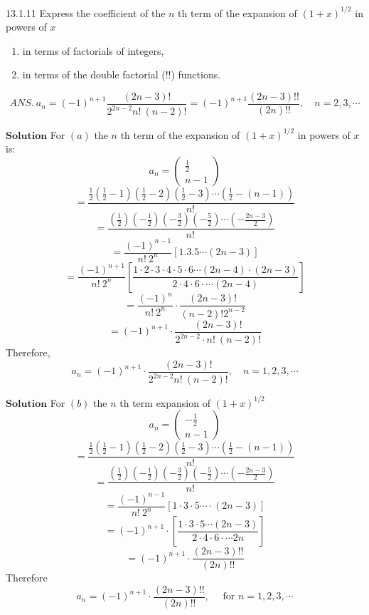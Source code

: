 \documentclass{article}
\begin{document}
\begin{flushleft}
\newpage

\begin{mybox}{13.1.11}
Express the coefficient of the $n$ th term of the expansion of $(1+x)^{1 / 2}$ in powers of $x$
\begin{enumerate}[$(a)$]
\item in terms of factorials of integers,
\item in terms of the double factorial (!!) functions.
\end{enumerate} 
$$
A N S . \ a_{n}=(-1)^{n+1} \frac{(2 n-3) !}{2^{2 n-2} n! \ (n-2) !}=(-1)^{n+1} \frac{(2 n-3) ! !}{(2 n) ! !},\quad n=2,3,  \cdots
$$
\end{mybox}

$\boxed{\textbf{Solution}}$ For $(a)$ the $n$ th term of the expansion of $(1+x)^{1 / 2}$ in powers of $x$ is:
$$a_{n}=\left(\begin{array}{c}\frac{1}{2} \\ n-1\end{array}\right)$$
$$=\frac{\frac{1}{2}\left(\frac{1}{2}-1\right)\left(\frac{1}{2}-2\right)\left(\frac{1}{2}-3\right) \cdots\left(\frac{1}{2}-(n-1)\right)}{n! \ }$$
$$=\frac{\left(\frac{1}{2}\right)\left(-\frac{1}{2}\right)\left(-\frac{3}{2}\right)\left(-\frac{5}{2}\right) \cdots\left(-\frac{2 n-3}{2}\right)}{n! \ }$$
$$=\frac{(-1)^{n-1}}{n! \  2^{n}}[1.3 .5   \cdots (2 n-3)]$$
$$=\frac{(-1)^{n+1}}{n! \  2^{n}}\left[\frac{1\cdot 2  \cdot 3  \cdot 4  \cdot 5  \cdot 6  \cdots (2 n-4) \cdot(2 n-3)}{2 \cdot 4  \cdot 6  \cdot   \cdots (2 n-4)}\right]$$
$$=\frac{(-1)^{n}}{n! \  2^{n}} \cdot \frac{(2 n-3) !}{(n-2) ! 2^{n-2}}$$
$$=(-1)^{n+1} \cdot \frac{(2 n-3) !}{2^{2 n-2} \cdot n! \ (n-2) !}$$
Therefore, 
$$
a_{n}=(-1)^{n+1} \cdot \frac{(2 n-3) !}{2^{2 n-2} n! \ (n-2) !}, \quad  n=1,2,3, \cdots
$$

$\boxed{\textbf{Solution}}$ For $(b)$ the $n$ th term expansion of $(1+x)^{1 / 2}$ 
$$a_{n}=\left(\begin{array}{c}-\frac{1}{2} \\ n-1\end{array}\right)$$
$$=\frac{\frac{1}{2}\left(\frac{1}{2}-1\right)\left(\frac{1}{2}-2\right)\left(\frac{1}{2}-3\right) \cdots\left(\frac{1}{2}-(n-1)\right)}{n! \ }$$
$$=\frac{\left(\frac{1}{2}\right)\left(-\frac{1}{2}\right)\left(-\frac{3}{2}\right)\left(-\frac{5}{2}\right) \cdots\left(-\frac{2 n-3}{2}\right)}{n! \ }$$
$$=\frac{(-1)^{n-1}}{n! \  2^{n}}[1 \cdot 3  \cdot 5  \cdots  \cdot(2 n-3)]$$
$$=(-1)^{n+1} \cdot\left[\frac{1 \cdot 3  \cdot 5  \cdots (2 n-3)}{2 \cdot 4  \cdot 6 \cdot  \cdots 2 n}\right]$$
$$=(-1)^{n+1} \cdot \frac{(2 n-3) ! !}{(2 n) ! !}$$
Therefore
$$
a_{n}=(-1)^{n+1} \cdot \frac{(2 n-3) ! !}{(2 n) ! !}, \quad \text { for } n=1,2,3, \cdots
$$


\end{flushleft}
\end{document}
